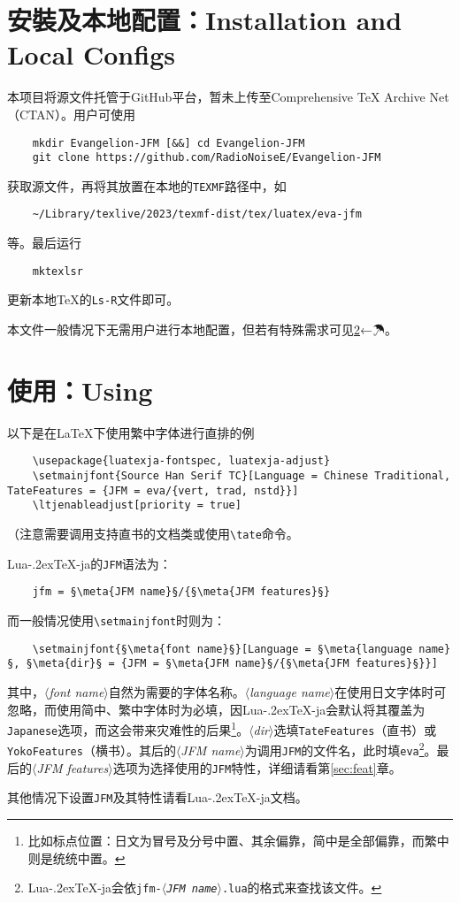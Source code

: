 \documentclass{ltjsarticle}
\def\meta#1{{\normalfont\rmfamily\itshape$\langle$#1\/$\rangle$}}
\def\段{\par}
\def\LuaTeX{Lua\kern-.2ex\TeX}
\begin{document}
\section{安裝及本地配置：Installation and Local Configs}
本项目将源文件托管于GitHub平台，暂未上传至Comprehensive \TeX{} Archive Net（CTAN）。用户可使用
\begin{lstlisting}
    mkdir Evangelion-JFM [&&] cd Evangelion-JFM
    git clone https://github.com/RadioNoiseE/Evangelion-JFM
\end{lstlisting}
获取源文件，再将其放置在本地的\texttt{TEXMF}路径中，如
\begin{lstlisting}
    ~/Library/texlive/2023/texmf-dist/tex/luatex/eva-jfm
\end{lstlisting}
等。最后运行
\begin{lstlisting}
    mktexlsr
\end{lstlisting}
更新本地\TeX{}的\texttt{Ls-R}文件即可。\段
本文件一般情况下无需用户进行本地配置，但若有特殊需求可见\ref{}←☂。

\section{使用：Using}
以下是在\LaTeX{}下使用繁中字体进行直排的例
\begin{lstlisting}
    \usepackage{luatexja-fontspec, luatexja-adjust}
    \setmainjfont{Source Han Serif TC}[Language = Chinese Traditional, TateFeatures = {JFM = eva/{vert, trad, nstd}}]
    \ltjenableadjust[priority = true]
\end{lstlisting}
（注意需要调用支持直书的文档类或使用\texttt{\textbackslash{}tate}命令。\段
\LuaTeX-ja的\texttt{JFM}语法为：
\begin{lstlisting}
    jfm = §\meta{JFM name}§/{§\meta{JFM features}§}
\end{lstlisting}
而一般情况使用\texttt{\textbackslash{}setmainjfont}时则为：
\begin{lstlisting}
    \setmainjfont{§\meta{font name}§}[Language = §\meta{language name}§, §\meta{dir}§ = {JFM = §\meta{JFM name}§/{§\meta{JFM features}§}}]
\end{lstlisting}
其中，\meta{font name}自然为需要的字体名称。\meta{language name}在使用日文字体时可忽略，而使用简中、繁中字体时为必填，因\LuaTeX-ja会默认将其覆盖为\texttt{Japanese}选项，而这会带来灾难性的后果\footnote{比如标点位置：日文为冒号及分号中置、其余偏靠，简中是全部偏靠，而繁中则是统统中置。}。\meta{dir}选填\texttt{TateFeatures}（直书）或\texttt{YokoFeatures}（横书）。其后的\meta{JFM name}为调用\texttt{JFM}的文件名，此时填\texttt{eva}\footnote{\LuaTeX-ja会依\texttt{jfm-\meta{JFM name}.lua}的格式来查找该文件。}。最后的\meta{JFM features}选项为选择使用的\texttt{JFM}特性，详细请看第\ref{sec:feat}章。\段
其他情况下设置\texttt{JFM}及其特性请看\LuaTeX-ja文档\cite{luatexja-doc}。
\end{document}
